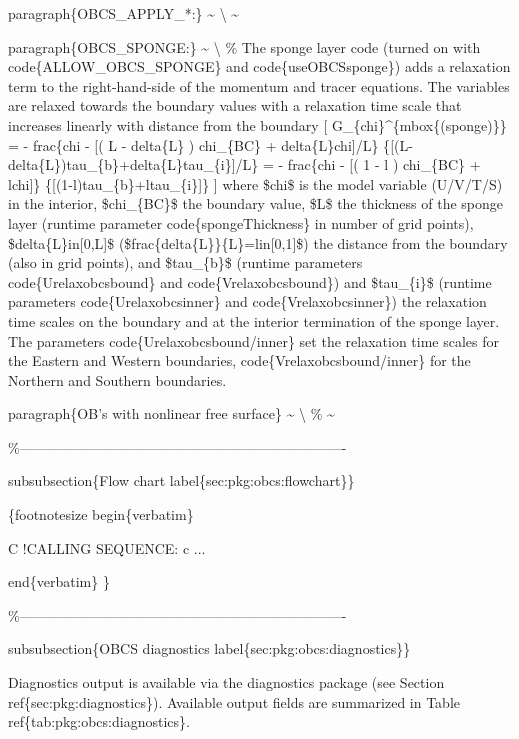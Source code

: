 \documentclass[letterpaper,10pt,english]{sphinxmanual}
\begin{document}
paragraph\{OBCS\_APPLY\_*:\} \textasciitilde{} \textbackslash{}
\textasciitilde{}

paragraph\{OBCS\_SPONGE:\} \textasciitilde{} \textbackslash{}
\%
The sponge layer code (turned on with code\{ALLOW\_OBCS\_SPONGE\} and
code\{useOBCSsponge\}) adds a relaxation term to the right-hand-side of
the momentum and tracer equations. The variables are relaxed towards
the boundary values with a relaxation time scale that increases
linearly with distance from the boundary
{[}
G\_\{chi\}\textasciicircum{}\{mbox\{(sponge)\}\} =
- frac\{chi - {[}( L - delta\{L\} ) chi\_\{BC\} + delta\{L\}chi{]}/L\}
\{{[}(L-delta\{L\})tau\_\{b\}+delta\{L\}tau\_\{i\}{]}/L\}
= - frac\{chi - {[}( 1 - l ) chi\_\{BC\} + lchi{]}\}
\{{[}(1-l)tau\_\{b\}+ltau\_\{i\}{]}\}
{]}
where \$chi\$ is the model variable (U/V/T/S) in the interior,
\$chi\_\{BC\}\$ the boundary value, \$L\$ the thickness of the sponge layer
(runtime parameter code\{spongeThickness\} in number of grid points),
\$delta\{L\}in{[}0,L{]}\$ (\$frac\{delta\{L\}\}\{L\}=lin{[}0,1{]}\$) the distance from the boundary (also in grid points), and
\$tau\_\{b\}\$ (runtime parameters code\{Urelaxobcsbound\} and
code\{Vrelaxobcsbound\}) and \$tau\_\{i\}\$ (runtime parameters
code\{Urelaxobcsinner\} and code\{Vrelaxobcsinner\}) the relaxation time
scales on the boundary and at the interior termination of the sponge
layer. The parameters code\{Urelaxobcsbound/inner\} set the relaxation
time scales for the Eastern and Western boundaries,
code\{Vrelaxobcsbound/inner\} for the Northern and Southern boundaries.

paragraph\{OB's with nonlinear free surface\} \textasciitilde{} \textbackslash{}
\%
\textasciitilde{}

\%----------------------------------------------------------------------

subsubsection\{Flow chart
label\{sec:pkg:obcs:flowchart\}\}

\{footnotesize
begin\{verbatim\}

C     !CALLING SEQUENCE:
c ...

end\{verbatim\}
\}

\%----------------------------------------------------------------------

subsubsection\{OBCS diagnostics
label\{sec:pkg:obcs:diagnostics\}\}

Diagnostics output is available via the diagnostics package
(see Section ref\{sec:pkg:diagnostics\}).
Available output fields are summarized in
Table ref\{tab:pkg:obcs:diagnostics\}.
\end{document}
